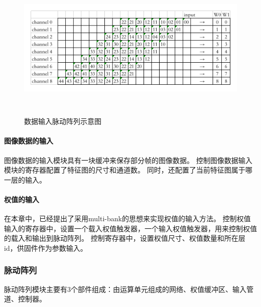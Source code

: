 \begin{figure}[htbp]
    \centering
    \includegraphics[width=15cm,height=7cm]{figures/input_systolic_array.png}
    \caption{数据输入脉动阵列示意图}
    \label{systolic}
\end{figure}


\paragraph{图像数据的输入}
图像数据的输入模块具有一块缓冲来保存部分帧的图像数据。
控制图像数据输入模块的寄存器配置了特征图的尺寸和通道数。
同时，还配置了当前特征图属于哪一层的输入。


\paragraph{权值的输入}
在本章中，已经提出了采用multi-bank的思想来实现权值的输入方法。
控制权值输入的寄存器中，设置一个载入权值触发器，一个输入权值触发器，用来控制权值的载入和输出到脉动阵列。
控制寄存器中，设置权值尺寸、权值数量和所在层id，供固件作为参数输入。


\subsubsection{脉动阵列}
脉动阵列模块主要有3个部件组成：由运算单元组成的网络、权值缓冲区、输入管道、控制器。

